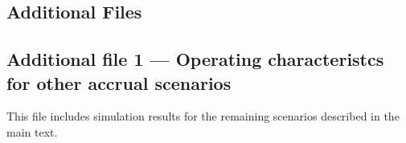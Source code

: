 \documentclass{bmcart}
\begin{document}
\begin{backmatter}

\section*{Additional Files}

\subsection*{Additional file 1 --- Operating characteristcs for other accrual scenarios}

This file includes simulation results for the remaining scenarios described in the main text.

\end{backmatter}
\end{document}
